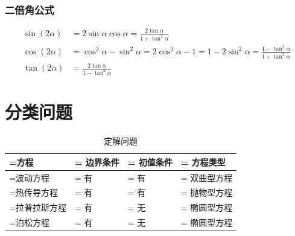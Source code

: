 \documentclass[12pt,fontset=windows,UTF8]{ctexart}
\begin{document}
\subsubsection{二倍角公式}

\begin{equation}
	\begin{aligned}
		\sin(2\alpha) & =2\sin\alpha\cos\alpha=\frac{2\tan\alpha}{1+\tan^2\alpha} \\
		\cos(2\alpha) & = \cos^2\alpha - \sin^2\alpha = 2\cos^2\alpha - 1 = 1 - 2\sin^2\alpha = \frac{1-\tan^2\alpha}{1+\tan^2\alpha} \\
		\tan(2\alpha) & = \frac{2\tan\alpha}{1-\tan^2\alpha}
	\end{aligned}
\end{equation}

\section{分类问题}

\begin{table}[H]
	\caption{定解问题}
	\label{tb:定解问题}
	\begin{tabularx}{\linewidth}{
		>{\hsize=0.4\hsize\linewidth=\hsize\centering\arraybackslash}X
		>{\hsize=0.2\hsize\linewidth=\hsize\centering\arraybackslash}X
		>{\hsize=0.2\hsize\linewidth=\hsize\centering\arraybackslash}X
		>{\hsize=0.2\hsize\linewidth=\hsize\centering\arraybackslash}X
	}
		\toprule
		方程 & 边界条件 & 初值条件 & 方程类型 \\
		\midrule
		波动方程 & 有 & 有 & 双曲型方程 \\
		热传导方程 & 有 & 有 & 抛物型方程 \\
		拉普拉斯方程 & 有 & 无 & 椭圆型方程 \\
		泊松方程 & 有 & 无 & 椭圆型方程 \\
		\bottomrule
	\end{tabularx}
\end{table}
\end{document}
